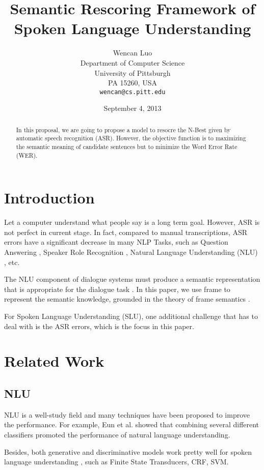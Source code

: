 \documentclass[11pt,letterpaper]{article}
\title{Semantic Rescoring Framework of Spoken Language Understanding}
\author{Wencan Luo\\
	    Department of Computer Science\\
	    University of Pittsburgh\\
	    PA 15260, USA\\
	    {\tt wencan@cs.pitt.edu}
	  }
\date{September 4, 2013}
\begin{document}
\maketitle
\begin{abstract}
In this proposal, we are going to propose a model to resocre the N-Best given by automatic speech recognition (ASR).
However, the objective function is to maximizing the semantic meaning of candidate sentences but to minimize the Word Error Rate (WER).

\end{abstract}

\section{Introduction}
Let a computer understand what people say is a long term goal. However, ASR is not perfect in current stage. 
In fact, compared to manual transcriptions, ASR errors have a significant decrease in many NLP Tasks, such as Question Answering \cite{Turmo:2007}, Speaker Role Recognition \cite{Garg:2008}, Natural Language Understanding (NLU) \cite{Raymond:2007}, etc.

The NLU component of dialogue systems must produce a semantic representation that is appropriate for the dialogue task \cite{Jurafsky:2000}. In this paper, we use frame to represent the semantic knowledge, grounded in the theory of frame semantics \cite{Fillmore:1982}.

For Spoken Language Understanding (SLU), one additional challenge that has to deal with is the ASR errors, which is the focus in this paper.

\section{Related Work}
\subsection{NLU}

NLU is a well-study field and many techniques have been proposed to improve the performance. For example, Eun et al. showed that combining several different classifiers promoted the performance of natural language understanding. 
 
Besides, both generative and discriminative models work pretty well for spoken language understanding \cite{Raymond:2007}, such as Finite State Transducers, CRF, SVM.
 
\end{document}
